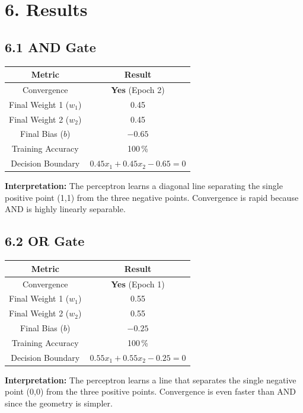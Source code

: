 \documentclass[11pt]{article}
\begin{document}
\section*{6. Results}

\subsection*{6.1 AND Gate}
\begin{center}
\begin{tabular}{|c|c|}
\hline
\textbf{Metric} & \textbf{Result}\\ \hline
Convergence & \textbf{Yes} (Epoch 2)\\ \hline
Final Weight 1 ($w_1$) & 0.45\\ \hline
Final Weight 2 ($w_2$) & 0.45\\ \hline
Final Bias ($b$) & $-0.65$\\ \hline
Training Accuracy & 100\,\%\\ \hline
Decision Boundary & $0.45 x_1 + 0.45 x_2 - 0.65 = 0$\\ \hline
\end{tabular}
\end{center}
\textbf{Interpretation:} The perceptron learns a diagonal line separating the single positive point (1,1) from the three negative points. Convergence is rapid because AND is highly linearly separable.

\subsection*{6.2 OR Gate}
\begin{center}
\begin{tabular}{|c|c|}
\hline
\textbf{Metric} & \textbf{Result}\\ \hline
Convergence & \textbf{Yes} (Epoch 1)\\ \hline
Final Weight 1 ($w_1$) & 0.55\\ \hline
Final Weight 2 ($w_2$) & 0.55\\ \hline
Final Bias ($b$) & $-0.25$\\ \hline
Training Accuracy & 100\,\%\\ \hline
Decision Boundary & $0.55 x_1 + 0.55 x_2 - 0.25 = 0$\\ \hline
\end{tabular}
\end{center}
\textbf{Interpretation:} The perceptron learns a line that separates the single negative point (0,0) from the three positive points. Convergence is even faster than AND since the geometry is simpler.
\end{document}
